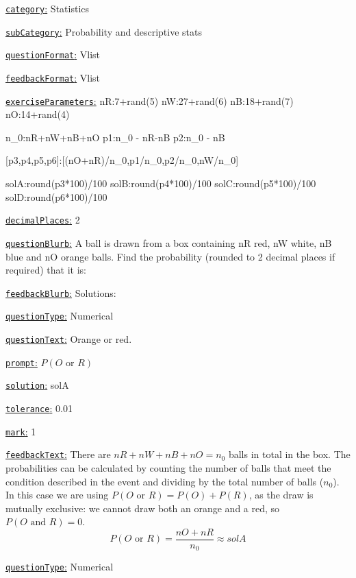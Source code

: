 \documentclass[preview]{standalone}
\newcommand \fieldname[1]{\underline{\texttt{#1}:}}
\begin{document}
\fieldname{category}  %
Statistics

\fieldname{subCategory} %
Probability and descriptive stats

\fieldname{questionFormat}
Vlist

\fieldname{feedbackFormat}
Vlist

\fieldname{exerciseParameters}
nR:7+rand(5)
nW:27+rand(6)
nB:18+rand(7)
nO:14+rand(4)

n_0:nR+nW+nB+nO
p1:n_0 - nR-nB
p2:n_0 - nB

[p3,p4,p5,p6]:[(nO+nR)/n_0,p1/n_0,p2/n_0,nW/n_0]

solA:round(p3*100)/100
solB:round(p4*100)/100
solC:round(p5*100)/100
solD:round(p6*100)/100

\fieldname{decimalPlaces}
2

\fieldname{questionBlurb}
A ball is drawn from a box containing {nR} red, {nW} white, {nB} blue and {nO} orange balls. Find the probability (rounded to 2 decimal places if required) that it is:

\fieldname{feedbackBlurb}
Solutions:

\fieldname{questionType}
Numerical

\fieldname{questionText}
Orange or red.

\fieldname{prompt}
$P(O \textrm{ or } R)$

\fieldname{solution}
solA

\fieldname{tolerance}
0.01

\fieldname{mark}
1

\fieldname{feedbackText}
There are ${nR} + {nW} + {nB} + {nO} = {n_0}$ balls in total in the box. The probabilities can be calculated by counting the number of balls that meet the condition described in the event and dividing by the total number of balls (${n_0}$). In this case we are using $P(O \textrm{ or } R) = P(O) + P(R)$, as the draw is mutually exclusive: we cannot draw both an orange and a red, so $P(O \textrm{ and } R) = 0$.
\[
P(O \textrm{ or } R) = \frac{{nO} + {nR}}{n_0} \approx {solA}
\]

\fieldname{questionType}
Numerical
\end{document}
